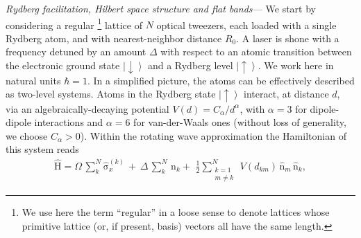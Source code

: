 \documentclass[prl,aps,twocolumn,showpacs,superscriptaddress,longbibliography]{revtex4-1}
\newcommand{\ran}{\right\rangle}
\newcommand{\ket}[1]{\left| #1 \ran}
\newcommand{\up}{\uparrow}
\newcommand{\down}{\downarrow}
\newcommand{\op}[1]{\mathrm{\hat{#1}}}
\begin{document}
\emph{Rydberg facilitation, Hilbert space structure and flat bands---} We start by considering a regular \footnote{We use here the term ``regular'' in a loose sense to denote lattices whose primitive lattice (or, if present, basis) vectors all have the same length.} lattice of $N$ optical tweezers, each loaded with a single Rydberg atom, and with nearest-neighbor distance $R_0$. A laser is shone with a frequency detuned by an amount $\Delta$ with respect to an atomic transition between the electronic ground state $\ket{\down}$ and a Rydberg level $\ket{\up}$. We work here in natural units $\hbar = 1$. In a simplified picture, the atoms can be effectively described as two-level systems. Atoms in the Rydberg state $\ket{\up}$ interact, at distance $d$, via an algebraically-decaying potential $V(d) = C_\alpha / d^\alpha$, with $\alpha = 3$ for dipole-dipole interactions and $\alpha = 6$ for van-der-Waals ones (without loss of generality, we choose $C_\alpha > 0$). Within the rotating wave approximation the Hamiltonian of this system reads
%
\begin{align}
 \op{H} = \Omega \, \sum_k^N  \op{\sigma}_x^{(k)} \, + \, \Delta\, \sum_k^N\,\op{n}_k +\,  \,
\frac{1}{2} \sum_{\substack{k= 1\\ m \ne k}}^N \, V(d_{km}) \, \op{n}_m\, \op{n}_k,
 \label{Eq:Hamil_full}
\end{align}
%
\end{document}
